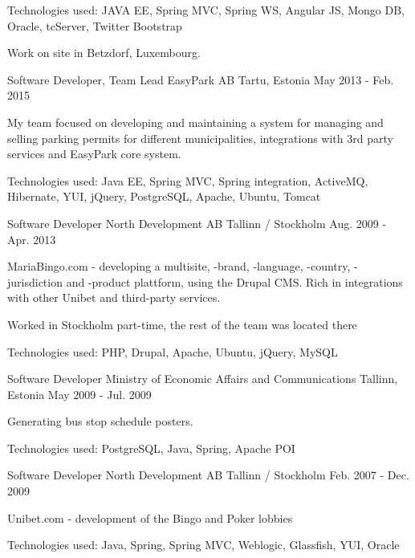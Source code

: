 \begin{cventries}
{\begin{cvitems}
      \item { Technologies used: JAVA EE, Spring MVC, Spring WS, Angular JS, Mongo DB, Oracle, tcServer, Twitter Bootstrap }
      \item { Work on site in Betzdorf, Luxembourg. }
    \end{cvitems}
  }
  \cventry
  {Software Developer, Team Lead}
  {EasyPark AB}
  {Tartu, Estonia}
  {May 2013 - Feb. 2015}
  {
    \begin{cvitems}
      \item {My team focused on developing and maintaining a system for managing and selling parking permits for different municipalities, integrations with 3rd party services and EasyPark core system.}
      \item {Technologies used: Java EE, Spring MVC, Spring integration, ActiveMQ, Hibernate, YUI, jQuery, PostgreSQL, Apache, Ubuntu, Tomcat }
    \end{cvitems}
  }
  \cventry
  {Software Developer}
  {North Development AB}
  {Tallinn / Stockholm}
  {Aug. 2009 - Apr. 2013}
  {
    \begin{cvitems}
      \item {MariaBingo.com - developing a multisite, -brand, -language, -country, -jurisdiction and -product plattform, using the Drupal CMS. Rich in integrations with other Unibet and third-party services.}
      \item {Worked in Stockholm part-time, the rest of the team was located there}
      \item { Technologies used: PHP, Drupal, Apache, Ubuntu, jQuery, MySQL }
    \end{cvitems}
  }
  \cventry
  {Software Developer}
  {Ministry of Economic Affairs and Communications}
  {Tallinn, Estonia}
  {May 2009 - Jul. 2009}
  {
    \begin{cvitems}
      \item { Generating bus stop schedule posters.}
      \item { Technologies used: PostgreSQL, Java, Spring, Apache POI }
    \end{cvitems}
  }
  \cventry
  {Software Developer}
  {North Development AB}
  {Tallinn / Stockholm}
  {Feb. 2007 - Dec. 2009}
  {
    \begin{cvitems}
      \item { Unibet.com - development of the Bingo and Poker lobbies}
      \item { Technologies used: Java, Spring, Spring MVC, Weblogic, Glassfish, YUI, Oracle }
    \end{cvitems}
}
\end{cventries}
